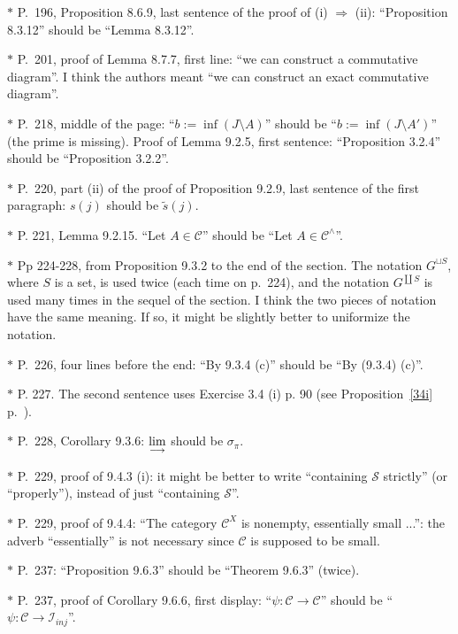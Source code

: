 \documentclass[12pt]{article}
\theoremstyle{remark}
\theoremstyle{definition}
\newcommand{\C}{\mathcal C}
\newcommand{\then}{\Rightarrow}
\newcommand{\ilim}{\operatornamewithlimits{\underset{\longrightarrow}{lim}}}
\begin{document}
\noindent $*$ P.~196, Proposition 8.6.9, last sentence of the proof of (i) $\then$ (ii): ``Proposition 8.3.12'' should be ``Lemma 8.3.12''.


\noindent $*$ P.~201, proof of Lemma 8.7.7, first line: ``we can construct a commutative diagram''. I think the authors meant ``we can construct an exact commutative diagram''.

\noindent $*$ P.~218, middle of the page: ``$b:=\inf(J\setminus A)$'' should be ``$b:=\inf(J\setminus A')$'' (the prime is missing). Proof of Lemma 9.2.5, first sentence: ``Proposition 3.2.4'' should be ``Proposition 3.2.2''.

\noindent $*$ P.~220, part (ii) of the proof of Proposition 9.2.9, last sentence of the first paragraph: $s(j)$ should be $\tilde s(j)$.

\noindent $*$ P. 221, Lemma 9.2.15. ``Let $A\in\C$'' should be ``Let $A\in\C^\wedge$''.

\noindent $*$ Pp 224-228, from Proposition 9.3.2 to the end of the section. The notation $G^{\sqcup S}$, where $S$ is a set, is used twice (each time on p.~224), and the notation $G^{\coprod S}$ is used many times in the sequel of the section. I think the two pieces of notation have the same meaning. If so, it might be slightly better to uniformize the notation.

\noindent $*$ P.~226, four lines before the end: ``By 9.3.4 (c)'' should be ``By (9.3.4) (c)''.

\noindent $*$ P. 227. The second sentence uses Exercise 3.4 (i) p. 90 (see Proposition~\ref{34i} p.~\pageref{34i}).

\noindent $*$ P.~228, Corollary 9.3.6: $\ilim$ should be $\sigma_\pi$.

\noindent $*$ P.~229, proof of 9.4.3 (i): it might be better to write ``containing $\mathcal S$ strictly'' (or ``properly''), instead of just ``containing $\mathcal S$''. 

\noindent $*$ P.~229, proof of 9.4.4: ``The category $\C^X$ is nonempty, essentially small ...'': the adverb ``essentially'' is not necessary since $\C$ is supposed to be small.

\noindent $*$ P.~237: ``Proposition 9.6.3'' should be ``Theorem 9.6.3'' (twice). 

\noindent $*$ P.~237, proof of Corollary 9.6.6, first display: ``$\psi:\C\to\C$'' should be ``$\psi:\C\to\mathcal I_{inj}$''. %
\end{document}
